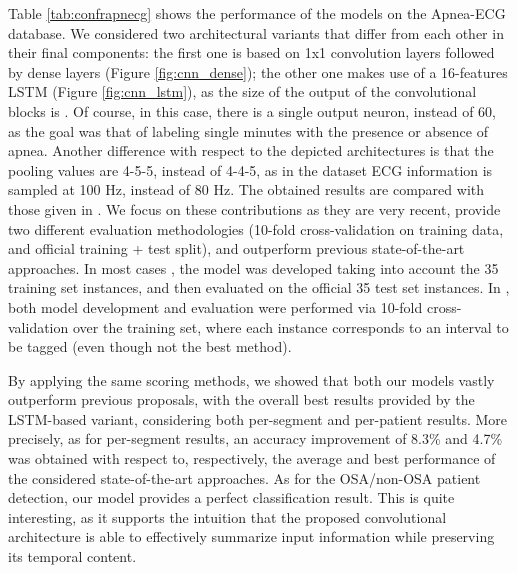 \documentclass[5p,twocolumn,lefttitle]{elsarticle}
\begin{document}
Table \ref{tab:confrapnecg} shows the performance of the models on the Apnea-ECG database. We considered two architectural variants that differ from each other in their final components: the first one is based on 1x1 convolution layers followed by dense layers (Figure \ref{fig:cnn_dense}); the other one makes use of a 16-features LSTM (Figure \ref{fig:cnn_lstm}), as the size of the output of the convolutional blocks is . Of course, in this case, there is a single output neuron, instead of 60, as the goal was that of labeling single minutes with the presence or absence of apnea. Another difference with respect to the depicted architectures is that the pooling values are 4-5-5, instead of 4-4-5, as in the dataset ECG information is sampled at 100 Hz, instead of 80 Hz. The obtained results are compared with those given in \cite{DBLP:conf/cinc/SadrC14,DBLP:journals/cbm/SharmaS16,DBLP:journals/tbe/SongLZCX16,li2018method,singh2019novel,DBLP:journals/sensors/ChangYLL20,almutairi2020detection,sharma2020sleep,feng2020sleep,shen2021multiscale,martin2017heart,wang2019sleep,fatimah2020detection}. We focus on these contributions as they are very recent, provide two different evaluation methodologies (10-fold cross-validation on training data, and official training + test split), and outperform previous state-of-the-art approaches. In most cases \cite{DBLP:conf/cinc/SadrC14,DBLP:journals/cbm/SharmaS16,DBLP:journals/tbe/SongLZCX16,li2018method,singh2019novel,DBLP:journals/sensors/ChangYLL20,sharma2020sleep,feng2020sleep,shen2021multiscale,martin2017heart,wang2019sleep}, the model was developed taking into account the 35 training set instances, and then evaluated on the official 35 test set instances. In \cite{almutairi2020detection,fatimah2020detection}, both model development and evaluation were performed via 10-fold cross-validation over the training set, where each instance corresponds to an interval to be tagged (even though not the best method). 

By applying the same scoring methods, we showed that both our models vastly outperform previous proposals, with the overall best results provided by the LSTM-based variant, considering both per-segment and per-patient results. More precisely, as for per-segment results, an accuracy improvement of 8.3\% and 4.7\% was obtained with respect to, respectively, the average and best performance of the considered state-of-the-art approaches. As for the OSA/non-OSA patient detection, our model provides a perfect classification result. 
This is quite interesting, as it supports the intuition that the proposed convolutional architecture is able to effectively summarize input information while preserving its temporal content. 
\end{document}
